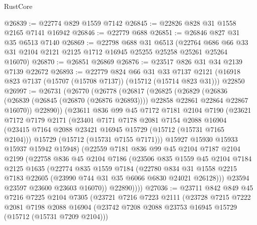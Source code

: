 \begin{lexlean}{RustCore}
\begin{coremodule}
@26839 := @22774 @829 @1559 @7142
@26845 := @22826 @828 @31 @1558 @2165 @7141 @16942
@26846 := @22779 @688
@26851 := @26846 @827 @31 @35 @6513 @7140
@26869 := @22798
    @688
    @31
    @6513
    (@22764 @686 @66 @33 @31 @2104 @2121 @2125 @1712 @16945 @25255 @25258 @25261 @25264 @16070)
@26870 := @26851 @26869
@26876 := @23517 @826 @31 @34 @2139 @7139 @22672
@26893 := @22779
    @824
    @66
    @31
    @33
    @7137
    @2121
    (@16918 @823 @7137 (@15707 (@15708 @7137)) (@15712 (@15714 @823 @31)))
    @22850
@26997 := @26731
    (@26770
      (@26778
        (@26817
          (@26825
            (@26829
              (@26836
                (@26839 (@26845 (@26870 (@26876 @26893))))
                @22858
                @22861
                @22864
                @22867
                @16070))
            @22890))
        (@23611
          @836
          @99
          @45
          @7172
          @7181
          @2104
          @7190
          (@23621
            @7172
            @7179
            @2171
            (@23401
              @7171
              @7178
              @2081
              @7154
              @2088
              @16904
              (@23415 @7164 @2088 @23421 @16945 @15729 (@15712 (@15731 @7165 @2104)))
              @15729
              (@15712 (@15731 @7155 @7171)))
            @15927
            @15930
            @15933
            @15937
            @15942
            @15948)
          (@22559
            @7181
            @836
            @99
            @45
            @2104
            @7187
            @2104
            @2199
            (@22758
              @836
              @45
              @2104
              @7186
              (@23506
                @835
                @1559
                @45
                @2104
                @7184
                @2125
                @1635
                (@22774
                  @835
                  @1559
                  @7184
                  (@22780
                    @834
                    @31
                    @1558
                    @2215
                    @7183
                    @22605
                    (@23990 @744 @31 @35 @6066 @6830 @24021 @26128)))
                @23594
                @23597
                @23600
                @23603
                @16070))
            @22890))))
@27036 := @23711
    @842
    @849
    @45
    @7216
    @7225
    @2104
    @7305
    (@23721
      @7216
      @7223
      @2111
      (@23728
        @7215
        @7222
        @2081
        @7198
        @2088
        @16904
        (@23742 @7208 @2088 @23753 @16945 @15729 (@15712 (@15731 @7209 @2104)))

\end{coremodule}
\end{lexlean}
